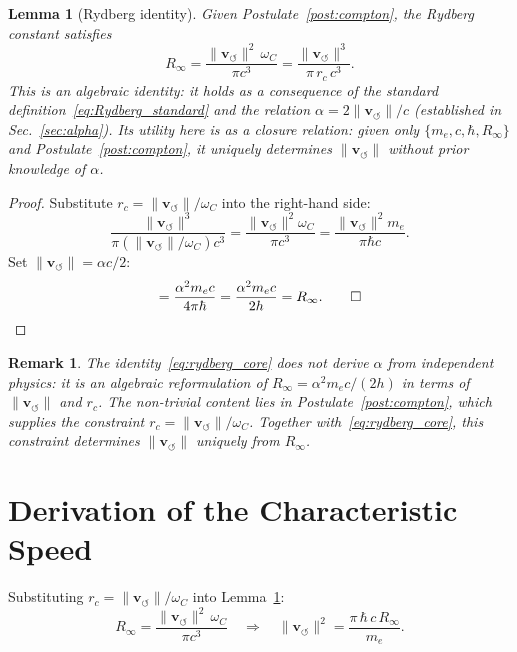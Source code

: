 \documentclass[aps,pra,preprint,longbibliography,nofootinbib]{revtex4-2}
\newtheorem{lemma}{Lemma}
\newtheorem{remark}{Remark}
\newcommand{\vnorm}{\lVert\mathbf{v}_{\!\boldsymbol{\circlearrowleft}}\rVert} %
\newcommand{\rc}{r_c}                            %
\newcommand{\omC}{\omega_C}                      %
\newcommand{\Rinf}{R_\infty}                     %
\begin{document}
\begin{lemma}[Rydberg identity]
\label{lem:rydberg}
Given Postulate~\ref{post:compton}, the Rydberg constant satisfies
\begin{equation}
  \Rinf = \frac{\vnorm^2\,\omC}{\pi c^3}
         = \frac{\vnorm^3}{\pi\,\rc\,c^3}.
  \label{eq:rydberg_core}
\end{equation}
This is an algebraic identity: it holds as a consequence of the
standard definition~\eqref{eq:Rydberg_standard} and the relation
$\alpha = 2\vnorm/c$ (established in Sec.~\ref{sec:alpha}).
Its utility here is as a \emph{closure relation}: given only
$\{m_e, c, \hbar, \Rinf\}$ and Postulate~\ref{post:compton},
it uniquely determines $\vnorm$ without prior knowledge of $\alpha$.
\end{lemma}

\begin{proof}
Substitute $\rc = \vnorm/\omC$ into the right-hand side:
\[
  \frac{\vnorm^3}{\pi(\vnorm/\omC)c^3}
  = \frac{\vnorm^2\omC}{\pi c^3}
  = \frac{\vnorm^2 m_e}{\pi\hbar c}. 
\]
Set $\vnorm = \alpha c/2$:
\[
  = \frac{\alpha^2 m_e c}{4\pi\hbar}
  = \frac{\alpha^2 m_e c}{2h}
  = \Rinf. \qed
\]
\end{proof}

\begin{remark}
\label{rem:algebraic_status}
The identity~\eqref{eq:rydberg_core} does not derive $\alpha$ from
independent physics: it is an algebraic reformulation of
$\Rinf = \alpha^2 m_e c/(2h)$ in terms of $\vnorm$ and $\rc$.
The non-trivial content lies in Postulate~\ref{post:compton}, which
supplies the constraint $\rc = \vnorm/\omC$.
Together with~\eqref{eq:rydberg_core}, this constraint determines
$\vnorm$ uniquely from $\Rinf$.
\end{remark}

\section{Derivation of the Characteristic Speed}
\label{sec:derivation}

Substituting $\rc = \vnorm/\omC$ into Lemma~\ref{lem:rydberg}:
\begin{equation}
  \Rinf = \frac{\vnorm^2\,\omC}{\pi c^3}
  \quad\Longrightarrow\quad
  \vnorm^2 = \frac{\pi\,\hbar\,c\,\Rinf}{m_e}.
  \label{eq:vc_solve}
\end{equation}
\end{document}
